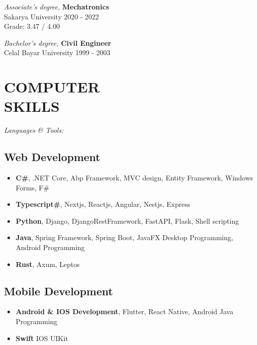 \documentclass[line,margin]{res}
\begin{document}
\begin{resume}
                {\sl Associate's degree,} \textbf{Mechatronics} \\
                Sakarya University 
                2020 - 2022 \\
                Grade: 3.47 / 4.00 

                {\sl Bachelor's degree,} \textbf{Civil Engineer} \\
                Celal Bayar University 
                1999 - 2003 \\
                

\noindent\hrulefill
\section{COMPUTER \\ SKILLS} {\sl Languages \& Tools:} \\
                \subsection{Web Development}
                 \begin{itemize}  \itemsep -2pt %
                   \item \textbf{C\#}, .NET Core, Abp Framework, MVC design, Entity Framework, Windows Forms, F\#
                   \item \textbf{Typescript\#}, Nextjs, Reactjs, Angular, Nestjs, Express
                   \item \textbf{Python}, Django, DjangoRestFramework, FastAPI, Flask, Shell scripting
                   \item \textbf{Java}, Spring Framework, Spring Boot, JavaFX Desktop Programming, Android Programming
                   \item \textbf{Rust}, Axum, Leptos
                 \end{itemize}
                 \subsection{Mobile Development}
                 \begin{itemize}  \itemsep -2pt %
                   \item \textbf{Android \& IOS Development}, Flutter, React Native, Android Java Programming
                   \item \textbf{Swift} IOS UIKit
                 \end{itemize}

\end{resume}
\end{document}
